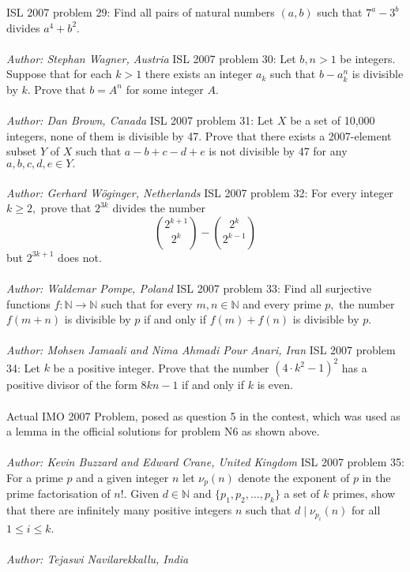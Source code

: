 ISL 2007 problem 29:  Find all pairs of natural numbers $ (a, b)$ such that $ 7^a - 3^b$ divides $ a^4 + b^2$. \\\\
\textit{Author: Stephan Wagner, Austria} 
ISL 2007 problem 30:  Let $b,n > 1$ be integers. Suppose that for each $k > 1$ there exists an integer $a_k$ such that $b - a^n_k$ is divisible by $k$. Prove that $b = A^n$ for some integer $A$. \\\\
\textit{Author: Dan Brown, Canada} 
ISL 2007 problem 31:  Let $ X$ be a set of 10,000 integers, none of them is divisible by 47. Prove that there exists a 2007-element subset $ Y$ of $ X$ such that $ a - b + c - d + e$ is not divisible by 47 for any $ a,b,c,d,e \in Y.$ \\\\
\textit{Author: Gerhard Wöginger, Netherlands} 
ISL 2007 problem 32:  For every integer $ k \geq 2,$ prove that $ 2^{3k}$ divides the number
\[ \binom{2^{k + 1}}{2^k} - \binom{2^k}{2^{k - 1}} \]
but $ 2^{3k + 1}$ does not. \\\\
\textit{Author: Waldemar Pompe, Poland} 
ISL 2007 problem 33:  Find all surjective functions $ f: \mathbb{N} \to \mathbb{N}$ such that for every $ m,n \in \mathbb{N}$ and every prime $ p,$ the number $ f(m + n)$ is divisible by $ p$ if and only if $ f(m) + f(n)$ is divisible by $ p$. \\\\
\textit{Author: Mohsen Jamaali and Nima Ahmadi Pour Anari, Iran} 
ISL 2007 problem 34:  Let $ k$ be a positive integer. Prove that the number $ (4 \cdot k^2 - 1)^2$ has a positive divisor of the form $ 8kn - 1$ if and only if $ k$ is even. \\\\
Actual IMO 2007 Problem, posed as question 5 in the contest, which was used as a lemma in the official solutions for problem N6 as shown above. \\\\
\textit{Author: Kevin Buzzard and Edward Crane, United Kingdom } 
ISL 2007 problem 35:  For a prime $ p$ and a given integer $ n$ let $ \nu_p(n)$ denote the exponent of $ p$ in the prime factorisation of $ n!$. Given $ d \in \mathbb{N}$ and $ \{p_1,p_2,\ldots,p_k\}$ a set of $ k$ primes, show that there are infinitely many positive integers $ n$ such that $ d\mid \nu_{p_i}(n)$ for all $ 1 \leq i \leq k$. \\\\
\textit{Author: Tejaswi Navilarekkallu, India} 

